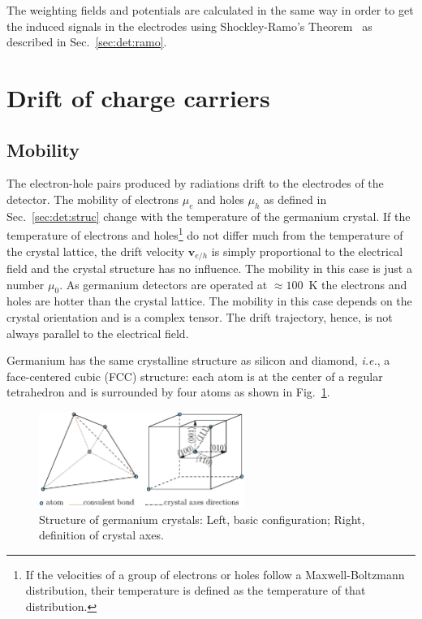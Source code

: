 The weighting fields and potentials are calculated in the same way in order to get the induced signals in the electrodes using Shockley-Ramo's Theorem~\cite{Gat82, Rad88, He00} as described in Sec.~\ref{sec:det:ramo}. 


\section{Drift of charge carriers}
\label{sec:pss:drift}

\subsection{Mobility}
\label{sec:pss:mobi}
The electron-hole pairs produced by radiations drift to the electrodes of the detector. The mobility of electrons $\mu_{e}$ and holes $\mu_{h}$ as defined in Sec.~\ref{sec:det:struc} change with the temperature of the germanium crystal. If the temperature of electrons and holes\footnote{If the velocities of a group of electrons or holes follow a Maxwell-Boltzmann distribution, their temperature is defined as the temperature of that distribution.} do not differ much from the temperature of the crystal lattice, the drift velocity $\mathbf{v}_{e/h}$ is simply proportional to the electrical field and the crystal structure has no influence. The mobility in this case is just a number $\mu_{0}$. As germanium detectors are operated at $\approx 100$~K the electrons and holes are hotter than the crystal lattice. The mobility in this case depends on the crystal orientation and is a complex tensor. The drift trajectory, hence, is not always parallel to the electrical field.

Germanium has the same crystalline structure as silicon and diamond, \textit{i.e.}, a face-centered cubic (FCC) structure: each atom is at the center of a regular tetrahedron and is surrounded by four atoms as shown in Fig.~\ref{fig:pss:xtal}.

\begin{figure}[tbhp]
\centering
\includegraphics[width=0.6\textwidth]{xtalStruc}  
\caption{Structure of germanium crystals: Left, basic configuration; Right, definition of crystal axes.}
\label{fig:pss:xtal}
\end{figure}

